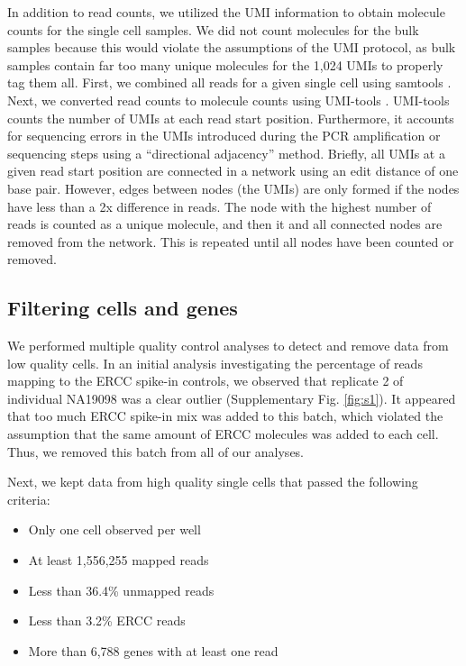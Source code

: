 In addition to read counts, we utilized the UMI information to obtain
molecule counts for the single cell samples. We did not count molecules
for the bulk samples because this would violate the assumptions of the
UMI protocol, as bulk samples contain far too many unique molecules for
the 1,024 UMIs to properly tag them all. First, we combined all reads
for a given single cell using samtools \citep{Li2009}. Next, we converted
read counts to molecule counts using UMI-tools \citep{Smith2016}.
UMI-tools counts the number of UMIs at each read start position.
Furthermore, it accounts for sequencing errors in the UMIs introduced
during the PCR amplification or sequencing steps using a ``directional
adjacency'' method. Briefly, all UMIs at a given read start position are
connected in a network using an edit distance of one base pair. However,
edges between nodes (the UMIs) are only formed if the nodes have less
than a 2x difference in reads. The node with the highest number of reads
is counted as a unique molecule, and then it and all connected nodes are
removed from the network. This is repeated until all nodes have been
counted or removed.

\subsection{Filtering cells and
genes}\label{filtering-cells-and-genes}

We performed multiple quality control analyses to detect and remove data
from low quality cells. In an initial analysis investigating the
percentage of reads mapping to the ERCC spike-in controls, we observed
that replicate 2 of individual NA19098 was a clear outlier
(Supplementary Fig. \ref{fig:s1}). It appeared that too much ERCC spike-in mix was
added to this batch, which violated the assumption that the same amount
of ERCC molecules was added to each cell. Thus, we removed this batch
from all of our analyses.

Next, we kept data from high quality single cells that passed the
following criteria:

\begin{itemize}
\itemsep1pt\parskip0pt
\item
  Only one cell observed per well
\item
  At least 1,556,255 mapped reads
\item
  Less than 36.4\% unmapped reads
\item
  Less than 3.2\% ERCC reads
\item
  More than 6,788 genes with at least one read
\end{itemize}

